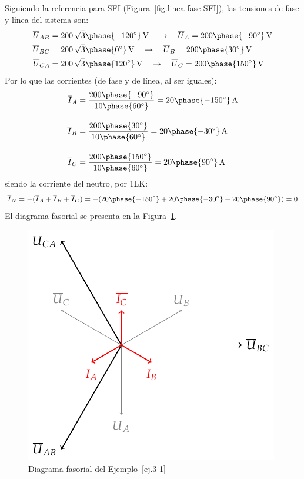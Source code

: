 \begin{example}
	    Siguiendo la referencia para SFI (Figura~\ref{fig.linea-fase-SFI}), las tensiones de fase y línea del sistema son:
	    \begin{align*}
	        \overline{U}_{AB} &= 200\,\sqrt{3}\phase{-120^\circ}\,\si{\volt} \quad\rightarrow\quad \overline{U}_A = 200\phase{-90^\circ}\,\si{\volt}\\
	        \overline{U}_{BC} &= 200\,\sqrt{3}\phase{0^\circ}\,\si{\volt} \quad\rightarrow\quad \overline{U}_B = 200\phase{30^\circ}\,\si{\volt}\\
	        \overline{U}_{CA} &= 200\,\sqrt{3}\phase{120^\circ}\,\si{\volt} \quad\rightarrow\quad \overline{U}_C=200\phase{150^\circ}\,\si{\volt}
	    \end{align*}
	    Por lo que las corrientes (de fase y de línea, al ser iguales):
	    \begin{align*}
	        \overline{I}_A &= \frac{200\phase{-90^\circ}}{10\phase{60^\circ}} =20\phase{-150^\circ} \,\si{\ampere} \\[10pt]
          \overline{I}_B &= \frac{200\phase{30^\circ}}{10\phase{60^\circ}} = 20\phase{-30^\circ} \,\si{\ampere}\\[10pt]
          \overline{I}_C &=\frac{200\phase{150^\circ}}{10\phase{60^\circ}} = 20\phase{90^\circ} \,\si{\ampere}
	    \end{align*}
	    siendo la corriente del neutro, por 1LK:
	    \begin{equation*}
	        \overline{I}_N=-(\overline{I}_A+\overline{I}_B+\overline{I}_C)=-(20\phase{-150^\circ}+20\phase{-30^\circ}+20\phase{90^\circ})=0
	    \end{equation*}
	    El diagrama fasorial se presenta en la Figura~\ref{fig.diagrama_ejemplo_3-1}. 
	    \begin{figure}[H]
	        \centering
	        \includegraphics[width=0.4\linewidth]{../figs/diagrama_ejemplo3_1.pdf}
	        \caption{Diagrama fasorial del Ejemplo~\ref{ej.3-1}}
	        \label{fig.diagrama_ejemplo_3-1}
	    \end{figure}
	\end{example}
	
